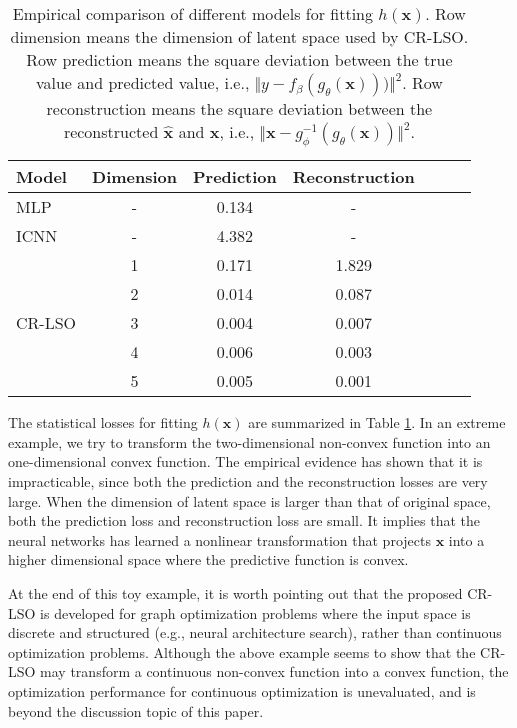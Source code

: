 \documentclass[10pt,twocolumn,letterpaper]{article}
\begin{document}
\begin{table}[htbp]
	\centering
	\caption{Empirical comparison of different models for fitting $h(\boldsymbol{x})$. Row dimension means the dimension of latent space used by CR-LSO. Row prediction means the square deviation between the true value and predicted value, i.e., $\Vert y - f_{\beta}(g_{\theta}(\boldsymbol{x}))) \Vert^{2}$. Row reconstruction means the square deviation between the reconstructed $\hat{\boldsymbol{x}}$ and $\boldsymbol{x}$, i.e., $\Vert \boldsymbol{x} - g_{\phi}^{-1}(g_{\theta}(\boldsymbol{x}))\Vert^{2}$.}
	\begin{tabular}{lcccccc}
		\toprule
		Model & Dimension & Prediction & Reconstruction \\
		\midrule
		MLP & - & 0.134 & -  \\
		ICNN & - & 4.382 & -  \\
		\midrule
		\multirow{6}{*}{CR-LSO} & 1 & 0.171 & 1.829 \\
		{} & 2 & 0.014 & 0.087  \\
		{} & 3 & 0.004 & 0.007  \\
		{} & 4 & 0.006 & 0.003 \\
		{} & 5 & 0.005 & 0.001  \\
		\bottomrule
	\end{tabular}
	\label{tab:empirical_comparison}
\end{table}

The statistical losses for fitting $h(\boldsymbol{x})$ are summarized in Table \ref{tab:empirical_comparison}. In an extreme example, we try to transform the two-dimensional non-convex function into an one-dimensional convex function. The empirical evidence has shown that it is impracticable, since both the prediction and the reconstruction losses are very large. When the dimension of latent space is larger than that of original space, both the prediction loss and reconstruction loss are small. It implies that the neural networks has learned a nonlinear transformation that projects $\boldsymbol{x}$ into a higher dimensional space where the predictive function is convex.  

At the end of this toy example, it is worth pointing out that the proposed CR-LSO is developed for graph optimization problems where the input space is discrete and structured (e.g., neural architecture search), rather than continuous optimization problems. Although the above example seems to show that the CR-LSO may transform a continuous non-convex function into a convex function, the optimization performance for continuous optimization is unevaluated, and is beyond the discussion topic of this paper. 
\end{document}
